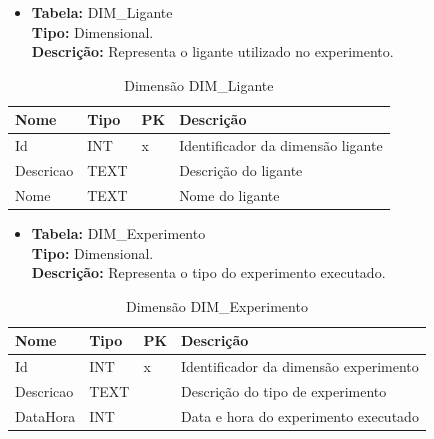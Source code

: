 \begin{itemize}
	\item
		\textbf{Tabela:} DIM\_Ligante \\
		\textbf{Tipo:} Dimensional. \\
		\textbf{Descrição:} Representa o ligante utilizado no experimento. \\
\end{itemize}
\begin{table}[h]
	\caption{Dimensão DIM\_Ligante}
	\centering
	\begin{tabular}{@{}llll@{}}
	\toprule
	\textbf{Nome} & \textbf{Tipo} & \textbf{PK} & \textbf{Descrição}           		   \\ \midrule
	Id            & INT           & x           & Identificador da dimensão ligante    \\
	Descricao     & TEXT       &             & Descrição do ligante           	   \\
	Nome 		  & TEXT       &             & Nome do ligante 					   \\ \bottomrule
	\end{tabular}
\end{table}


\begin{itemize}
	\item
		\textbf{Tabela:} DIM\_Experimento \\
		\textbf{Tipo:} Dimensional. \\
		\textbf{Descrição:} Representa o tipo do experimento executado. \\
\end{itemize}

\begin{table}[h]
	\caption{Dimensão DIM\_Experimento}
	\centering
	\begin{tabular}{@{}llll@{}}
	\toprule
	\textbf{Nome} 	& \textbf{Tipo} & \textbf{PK} & \textbf{Descrição}           			\\ \midrule
	Id            	& INT           & x           & Identificador da dimensão experimento   \\
	Descricao     	& TEXT       &             & Descrição do tipo de experimento        \\
	DataHora 		& INT 		    &             & Data e hora do experimento executado 	\\ \bottomrule
	\end{tabular}
\end{table}

